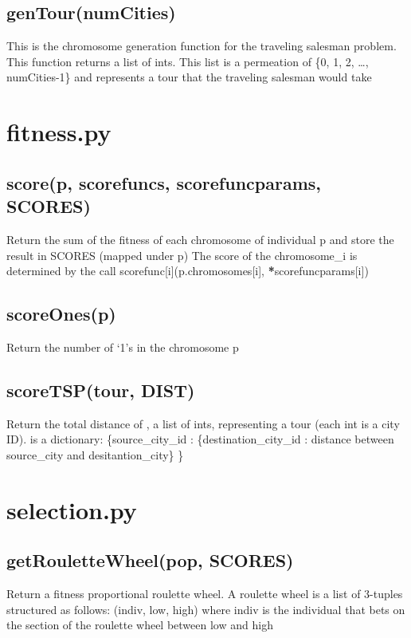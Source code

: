 \documentclass[letterpaper,10pt,english]{sphinxmanual}
\begin{document}
\section{genTour(numCities)}
\label{population.py:gentour-numcities}
This is the chromosome generation function for the traveling salesman problem. This function returns a list of ints. This list is a permeation of \{0, 1, 2, …, numCities-1\} and represents a tour that the traveling salesman would take


\chapter{fitness.py}
\label{fitness.py::doc}\label{fitness.py:fitness-py}

\section{score(p, scorefuncs, scorefuncparams, SCORES)}
\label{fitness.py:score-p-scorefuncs-scorefuncparams-scores}
Return the sum of the fitness of each chromosome of individual p and store the result in SCORES (mapped under p)
The score of the chromosome\_i is determined by the call scorefunc{[}i{]}(p.chromosomes{[}i{]}, {\color{red}\bfseries{}*}scorefuncparams{[}i{]})


\section{scoreOnes(p)}
\label{fitness.py:scoreones-p}
Return the number of `1's in the chromosome p


\section{scoreTSP(tour, DIST)}
\label{fitness.py:scoretsp-tour-dist}
Return the total distance of , a list of ints, representing a tour (each int is a city ID).
 is a dictionary: \{source\_city\_id : \{destination\_city\_id : distance between source\_city and desitantion\_city\} \}


\chapter{selection.py}
\label{selection.py::doc}\label{selection.py:selection-py}

\section{getRouletteWheel(pop, SCORES)}
\label{selection.py:getroulettewheel-pop-scores}
Return a fitness proportional roulette wheel.
A roulette wheel is a list of 3-tuples structured as follows:
(indiv, low, high) where indiv is the individual that bets on the section of the roulette wheel between low and high
\end{document}
